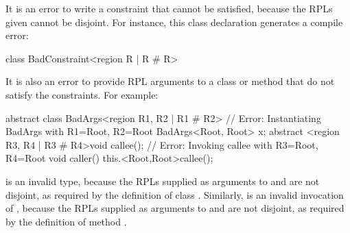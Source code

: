 It is an error to write a constraint that cannot be satisfied, because
the RPLs given cannot be disjoint.  For instance, this class
declaration generates a compile error:
%
\begin{dpjlisting}
class BadConstraint<region R | R # R> {}
\end{dpjlisting}

It is also an error to provide RPL arguments to a class or method that
do not satisfy the constraints.  For example:
%
\begin{dpjlisting}
abstract class BadArgs<region R1, R2 | R1 # R2> {
    // Error:  Instantiating BadArgs with R1=Root, R2=Root
    BadArgs<Root, Root> x;
    abstract <region R3, R4 | R3 # R4>void callee();
    // Error:  Invoking callee with R3=Root, R4=Root
    void caller() {
        this.<Root,Root>callee();
    }
}
\end{dpjlisting}
%
 is an invalid type, because the RPLs
supplied as arguments to  and  are not disjoint, as
required by the definition of class .  Similarly,
 is an invalid invocation of
, because the RPLs supplied as arguments to  and
 are not disjoint, as required by the definition of method
.

